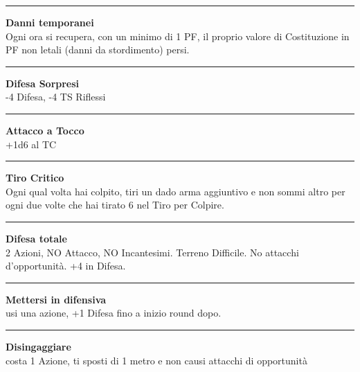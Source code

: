 \documentclass[a4paper,12 pt,openany]{book}
\newcommand{\riga}{\rule{\textwidth}{0.4pt}}
\begin{document}
\begin{textblock*}{6.2cm}
\riga

\textbf{Danni temporanei}\\ Ogni ora si recupera, con un minimo di 1 PF, il proprio valore di Costituzione in PF non letali (danni da stordimento) persi.

\riga

\textbf{Difesa Sorpresi}\\ -4 Difesa, -4 TS Riflessi

\riga

\textbf{Attacco a Tocco}\\ +1d6 al TC

\riga

\textbf{Tiro Critico}\\
Ogni qual volta hai colpito, tiri un dado arma aggiuntivo e non sommi altro per ogni due volte che hai tirato 6 nel Tiro per Colpire.

\riga


\textbf{Difesa totale}\\
2 Azioni, NO Attacco, NO Incantesimi. Terreno Difficile. No attacchi d'opportunità. +4 in Difesa.

\riga

\textbf{Mettersi in difensiva}\\
usi una azione, +1 Difesa fino a inizio round dopo.



\riga

\textbf{Disingaggiare}\\
costa 1 Azione, ti sposti di 1 metro e non causi attacchi di opportunità

\end{textblock*}



~\newpage
\end{document}
